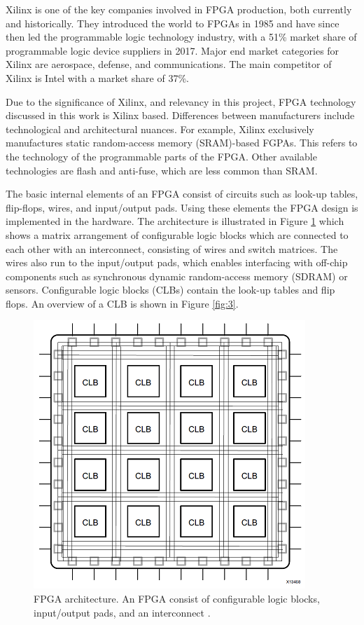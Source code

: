 \documentclass[12pt]{report}
\begin{document}
\par
Xilinx is one of the key companies involved in FPGA production, both currently and historically. They introduced the world to FPGAs in 1985 and have since then led the programmable logic technology industry, with a 51\% market share of programmable logic device suppliers in 2017. Major end market categories for Xilinx are aerospace, defense, and communications. The main competitor of Xilinx is Intel with a market share of 37\%. \citep{XilHist}\citep{XilShare}
\par 
Due to the significance of Xilinx, and relevancy in this project, FPGA technology discussed in this work is Xilinx based. Differences between manufacturers include technological and architectural nuances. For example, Xilinx exclusively manufactures static random-access memory (SRAM)-based FGPAs. This refers to the technology of the programmable parts of the FPGA. Other available technologies are flash and anti-fuse, which are less common than SRAM. \citep{FPGAarch1}
\par
The basic internal elements of an FPGA consist of circuits such as look-up tables, flip-flops, wires, and input/output pads. Using these elements the FPGA design is implemented in the hardware.
The architecture is illustrated in Figure \ref{fig:2} which shows a matrix arrangement of configurable logic blocks which are connected to each other with an interconnect, consisting of wires and switch matrices. The wires also run to the input/output pads, which enables interfacing with off-chip components such as synchronous dynamic random-access memory (SDRAM) or sensors. Configurable logic blocks (CLBs) contain the look-up tables and flip flops. An overview of a CLB is shown in Figure \ref{fig:3}. \citep{XilFPGAIntro}

\begin{figure}[h]
    \centering
    \includegraphics[scale=0.55]{figures/basic_fpga.png}
    \caption{FPGA architecture. An FPGA consist of configurable logic blocks, input/output pads, and an interconnect \citep{XilFPGAIntro}.}
    \label{fig:2}
\end{figure}
\end{document}
